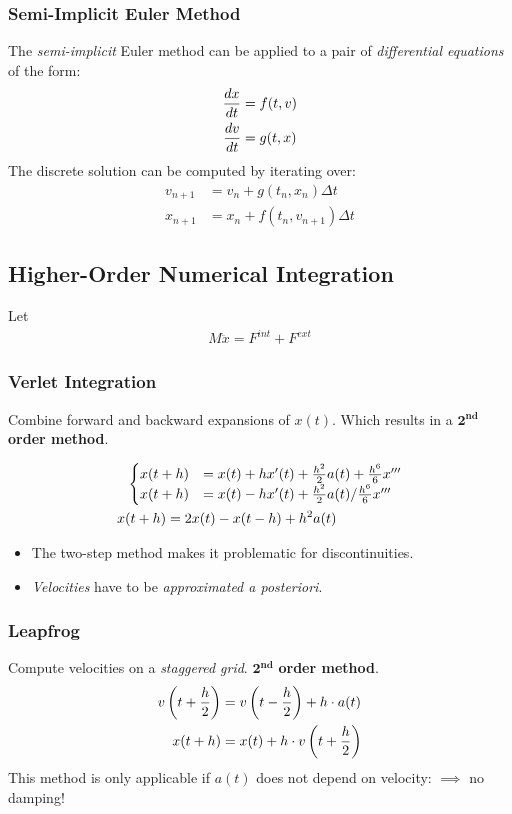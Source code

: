 \begin{multicols}{2}
\subsubsection{Semi-Implicit Euler Method}
The \emph{semi-implicit} Euler method can be applied to a pair of \emph{differential equations} of the form:
\begin{align*}
	{dx \over dt} &= f(t,v)\\
	{dv \over dt} &= g(t,x)
\end{align*}
The discrete solution can be computed by iterating over:
\begin{align*}
	v_{n+1} &= v_n + g(t_n, x_n)\Delta t\\
	x_{n+1} &= x_n + f(t_n, v_{n+1})\Delta t
\end{align*}

\subsection{Higher-Order Numerical Integration}
Let 
\begin{align*}
	M\ddot x = F^{int} + F^{ext}
\end{align*}
\subsubsection{Verlet Integration}
Combine forward and backward expansions of $x(t)$. Which results in a $\mathbf{2^{nd}}$ \textbf{order method}.

\begin{align*}
	&\  \ \begin{cases}
	x(t+h) &=  x(t) + hx'(t) + {h^2\over 2}a(t) + {h^6 \over 6} x'''\\ 
	x(t+h) &=  x(t) - hx'(t) + {h^2\over 2}a(t) / {h^6 \over 6} x'''
	\end{cases}\\
	&x(t+h) = 2 x(t) - x(t-h) + h^2a(t) 
\end{align*}

\begin{itemize}
	\item The two-step method makes it problematic for discontinuities.
	\item \emph{Velocities} have to be \emph{approximated a posteriori}.
\end{itemize}


\subsubsection{Leapfrog}
Compute velocities on a \emph{staggered grid}. $\mathbf{2^{nd}}$ \textbf{order method}.
\begin{align*}
	v\left(t+{h \over 2}\right) &= v \left(t - {h\over 2}\right) + h\cdot a(t)\\
	x(t+h) &= x(t) + h\cdot v\left( t + {h\over 2} \right)
\end{align*}
This method is only applicable if $a(t)$ does not depend on velocity: $\implies$ no damping!


\end{multicols}
